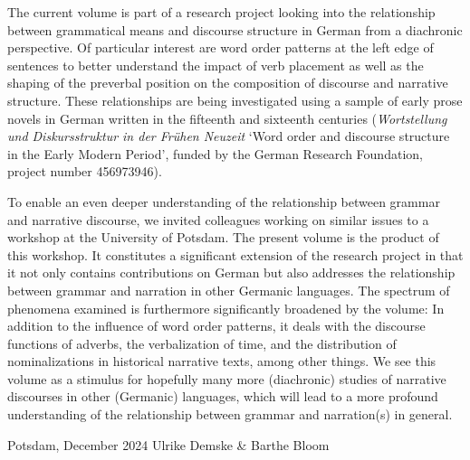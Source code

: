 \begin{refsection}
The current volume is part of a research project looking into the relationship between grammatical means and discourse structure in German from a diachronic perspective.  Of particular interest are word order patterns at the left edge of sentences to better understand the impact of verb placement as well as the shaping of the preverbal position on the composition of discourse and narrative structure. These relationships are being investigated using a sample of early prose novels in German written in the fifteenth and sixteenth centuries (\textit{Wortstellung und Diskursstruktur in der Frühen Neuzeit} `Word order and discourse structure in the Early Modern Period', funded by the German Research Foundation, project number 456973946). 

To enable an even deeper understanding of the relationship between grammar and narrative discourse, we invited colleagues working on similar issues to a workshop at the University of Potsdam. The present volume is the product of this workshop. It constitutes a significant extension of the research project in that it not only contains contributions on German but also addresses the relationship between grammar and narration in other Germanic languages. The spectrum of phenomena examined is furthermore significantly broadened by the volume: In addition to the influence of word order patterns, it deals with the discourse functions of adverbs, the verbalization of time, and the distribution of nominalizations in historical narrative texts, among other things. We see this volume as a stimulus for hopefully many more (diachronic) studies of narrative discourses in other (Germanic) languages, which will lead to a more profound understanding of the relationship between grammar and narration(s) in general.

\bigskip 

\noindent
Potsdam, December 2024 \hfill Ulrike Demske \& Barthe Bloom


\end{refsection}

